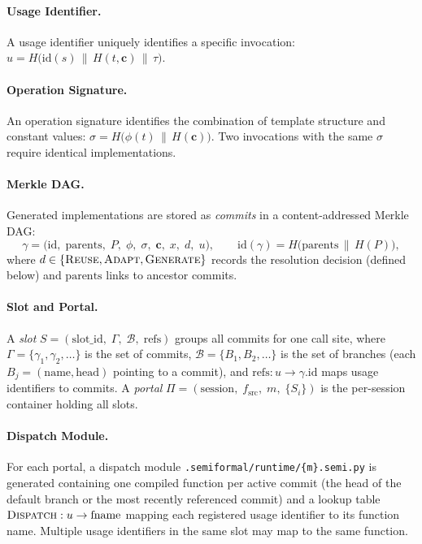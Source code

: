 \paragraph{Usage Identifier.}
A usage identifier uniquely identifies a specific invocation:
$u = H\!\bigl(\mathrm{id}(s) \,\|\, H(t, \mathbf{c}) \,\|\, \tau\bigr)$.

\paragraph{Operation Signature.}
An operation signature identifies the combination of template structure and
constant values: $\sigma = H\!\bigl(\phi(t) \,\|\, H(\mathbf{c})\bigr)$.
Two invocations with the same $\sigma$ require identical implementations.

\paragraph{Merkle DAG.}
Generated implementations are stored as \emph{commits} in a content-addressed
Merkle DAG:
\begin{equation}
\gamma = \bigl(\mathrm{id},\; \mathrm{parents},\; P,\; \phi,\; \sigma,\; \mathbf{c},\; x,\; d,\; u\bigr),
\qquad
\mathrm{id}(\gamma) = H\!\bigl(\mathrm{parents} \,\|\, H(P)\bigr),
\end{equation}
where $d \in \{\textsc{Reuse}, \textsc{Adapt}, \textsc{Generate}\}$ records
the resolution decision (defined below) and $\mathrm{parents}$ links to
ancestor commits.

\paragraph{Slot and Portal.}
A \emph{slot} $S = (\mathrm{slot\_id},\; \Gamma,\; \mathcal{B},\; \mathrm{refs})$
groups all commits for one call site, where
$\Gamma = \{\gamma_1, \gamma_2, \dots\}$ is the set of commits,
$\mathcal{B} = \{B_1, B_2, \dots\}$ is the set of branches (each
$B_j = (\mathrm{name}, \mathrm{head})$ pointing to a commit), and
$\mathrm{refs}: u \to \gamma.\mathrm{id}$ maps usage identifiers to commits.
A \emph{portal} $\Pi = (\mathrm{session},\; f_{\mathrm{src}},\;
m,\; \{S_i\})$ is the per-session container holding all slots.

\paragraph{Dispatch Module.}
For each portal, a dispatch module
\texttt{.semiformal/runtime/\{m\}.semi.py} is generated containing one
compiled function per active commit (the head of the default branch or the
most recently referenced commit) and a lookup table
$\textsc{Dispatch}: u \to \mathrm{fname}$ mapping each registered usage
identifier to its function name.  Multiple usage identifiers in the same slot
may map to the same function.

